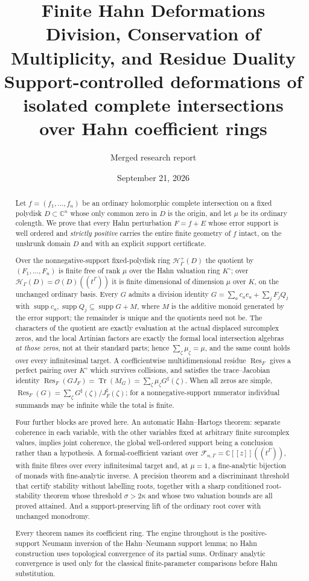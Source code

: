 \documentclass[11pt,letterpaper]{article}
\title{\bfseries Finite Hahn Deformations\\[0.35em]
\Large Division, Conservation of Multiplicity, and Residue Duality\\[0.55em]
\large Support-controlled deformations of isolated complete intersections\\
over Hahn coefficient rings}
\author{Merged research report}
\date{September 21, 2026}
\theoremstyle{definition}
\theoremstyle{remark}
\newcommand{\C}{\mathbb C}
\newcommand{\OO}{\mathcal O}
\newcommand{\HH}{\mathscr H}
\newcommand{\Hp}{\mathscr H^{+}}
\newcommand{\Af}{\mathscr F}
\newcommand{\Kc}{K^{\circ}}
\newcommand{\sh}{^{\sharp}}
\DeclareMathOperator{\supp}{supp}
\DeclareMathOperator{\Res}{Res}
\DeclareMathOperator{\Tr}{Tr}
\numberwithin{equation}{section}
\begin{document}
\maketitle

\begin{abstract}
Let $f=(f_1,\ldots,f_n)$ be an ordinary holomorphic complete intersection on a fixed polydisk $D\subset\C^n$ whose only common zero in $D$ is the origin, and let $\mu$ be its ordinary colength. We prove that every Hahn perturbation $F=f+E$ whose error support is well ordered and \emph{strictly positive} carries the entire finite geometry of $f$ intact, on the unshrunk domain $D$ and with an explicit support certificate.

Over the nonnegative-support fixed-polydisk ring $\Hp_\Gamma(D)$ the quotient by $(F_1,\ldots,F_n)$ is finite free of rank $\mu$ over the Hahn valuation ring $\Kc$; over $\HH_\Gamma(D)=\OO(D)((t^\Gamma))$ it is finite dimensional of dimension $\mu$ over $K$, on the unchanged ordinary basis. Every $G$ admits a division identity $G=\sum_a c_a e_a+\sum_j F_jQ_j$ with $\supp c_a,\supp Q_j\subseteq\supp G+M$, where $M$ is the additive monoid generated by the error support; the remainder is unique and the quotients need not be. The characters of the quotient are exactly evaluation at the actual displaced surcomplex zeros, and the local Artinian factors are exactly the formal local intersection algebras \emph{at those zeros}, not at their standard parts; hence $\sum_\zeta\mu_\zeta=\mu$, and the same count holds over every infinitesimal target. A coefficientwise multidimensional residue $\Res_F$ gives a perfect pairing over $\Kc$ which survives collisions, and satisfies the trace--Jacobian identity $\Res_F(GJ_F)=\Tr(M_G)=\sum_\zeta\mu_\zeta G\sh(\zeta)$. When all zeros are simple, $\Res_F(G)=\sum_\zeta G\sh(\zeta)/J_F\sh(\zeta)$; for a nonnegative-support numerator individual summands may be infinite while the total is finite.

Four further blocks are proved here. An automatic Hahn--Hartogs theorem: separate coherence in each variable, with the other variables fixed at arbitrary finite surcomplex values, implies joint coherence, the global well-ordered support being a conclusion rather than a hypothesis. A formal-coefficient variant over $\Af_{n,\Gamma}=\C[[z]]((t^\Gamma))$, with finite fibres over every infinitesimal target and, at $\mu=1$, a fine-analytic bijection of monads with fine-analytic inverse. A precision theorem and a discriminant threshold that certify stability without labelling roots, together with a sharp conditioned root-stability theorem whose threshold $\sigma>2\kappa$ and whose two valuation bounds are all proved attained. And a support-preserving lift of the ordinary root cover with unchanged monodromy.

Every theorem names its coefficient ring. The engine throughout is the positive-support Neumann inversion of the Hahn--Neumann support lemma; no Hahn construction uses topological convergence of its partial sums. Ordinary analytic convergence is used only for the classical finite-parameter comparisons before Hahn substitution.
\end{abstract}
\end{document}
